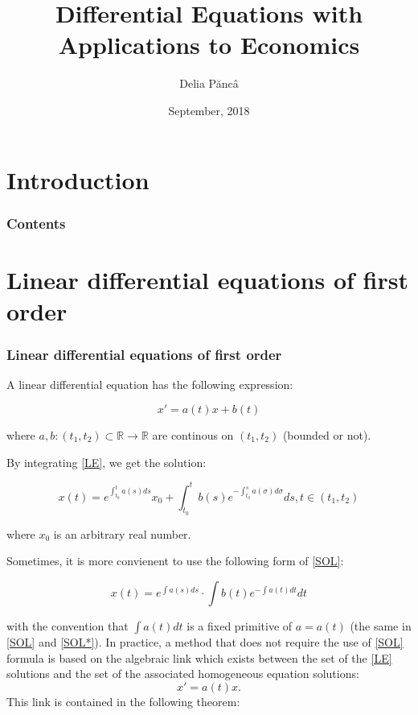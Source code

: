 \documentclass[11]{beamer}
\title[Bachelor's thesis]{Differential Equations with Applications to Economics}
\author{Delia P\u{a}nc\^{a}}
\institute[BBU Cluj-Napoca]{Babe\c s-Bolyai University Cluj-Napoca\\
Faculty of Mathematics and Computer Science}
\date{September, 2018}
\newcommand{\R}{\mathbb{R}}
\begin{document}
\begin{frame}
\titlepage
\end{frame}

\section*{Introduction}


\begin{frame}
\frametitle{Contents}
 \tableofcontents
\end{frame}

\section{Linear differential equations of first order}
\begin{frame}
\frametitle{Linear differential equations of first order}
A linear differential equation has the following expression:

\begin{equation}
 x'=a(t)x+b(t) \label{LE} \tag{LE}
\end{equation}

where $a,b: (t_1,t_2) \subset \R\rightarrow\R$ are continous on $(t_1,t_2)$ (bounded or not). 


\end{frame}

\begin{frame}
By integrating \eqref{LE}, we get the solution:

\begin{equation}
 x(t)=e^{\int_{t_0}^{t} a(s)ds}x_0 + \int_{t_0}^{t} b(s)e^{-\int_{t_0}^{s} a(\sigma)d\sigma}ds , t \in (t_1,t_2) \label{SOL} \tag{SOL}
\end{equation}

where $x_0$ is an arbitrary real number. 


\end{frame}


\begin{frame}
 Sometimes, it is more convienent to use the following form of \eqref{SOL}:

\begin{equation}
 x(t)= e^{\int a(s)ds}\cdot\int b(t)e^{-\int a(t) dt}dt \label{SOL*}\tag{SOL*}
\end{equation}

with the convention that $\int a(t) dt$ is a fixed primitive of $a=a(t)$ (the same in \eqref{SOL} and \eqref{SOL*}).
In practice, a method that does not require the use of \eqref{SOL} formula is based on the algebraic link which exists between the set of the \eqref{LE} solutions and the set of the associated homogeneous equation solutions: $$x'=a(t)x.$$
This link is contained in the following theorem:
\end{frame}
\end{document}
